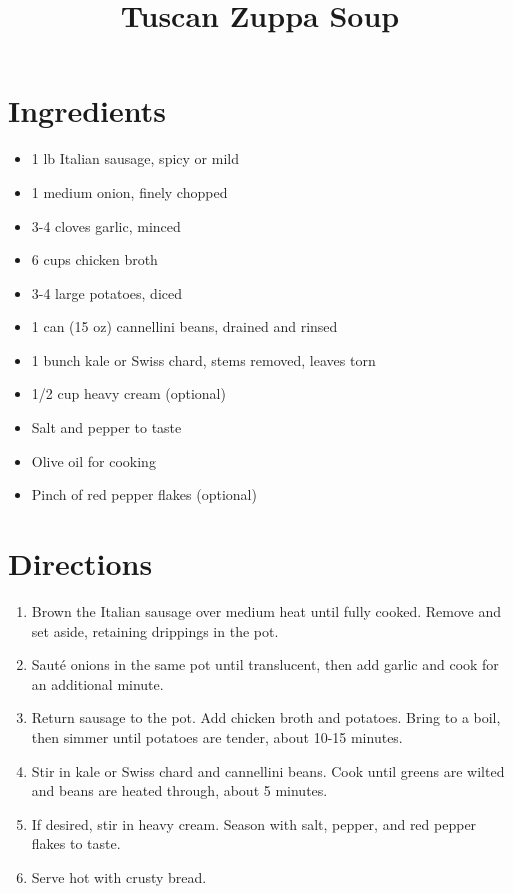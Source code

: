 \documentclass[11pt,letterpaper]{article}
\title{Tuscan Zuppa Soup}
\date{}
\author{}
\begin{document}
\maketitle

\section*{Ingredients}
\begin{multicols}{2}
    \begin{itemize}
        \item 1 lb Italian sausage, spicy or mild
        \item 1 medium onion, finely chopped
        \item 3-4 cloves garlic, minced
        \item 6 cups chicken broth
        \item 3-4 large potatoes, diced
        \item 1 can (15 oz) cannellini beans, drained and rinsed
    \end{itemize}
    \columnbreak
    \begin{itemize}
        \item 1 bunch kale or Swiss chard, stems removed, leaves torn
        \item 1/2 cup heavy cream (optional)
        \item Salt and pepper to taste
        \item Olive oil for cooking
        \item Pinch of red pepper flakes (optional)
    \end{itemize}
\end{multicols}

\section*{Directions}
\begin{enumerate}
    \item Brown the Italian sausage over medium heat until fully cooked. Remove and set aside, retaining drippings in the pot.
    \item Sauté onions in the same pot until translucent, then add garlic and cook for an additional minute.
    \item Return sausage to the pot. Add chicken broth and potatoes. Bring to a boil, then simmer until potatoes are tender, about 10-15 minutes.
    \item Stir in kale or Swiss chard and cannellini beans. Cook until greens are wilted and beans are heated through, about 5 minutes.
    \item If desired, stir in heavy cream. Season with salt, pepper, and red pepper flakes to taste.
    \item Serve hot with crusty bread.
\end{enumerate}
\end{document}
